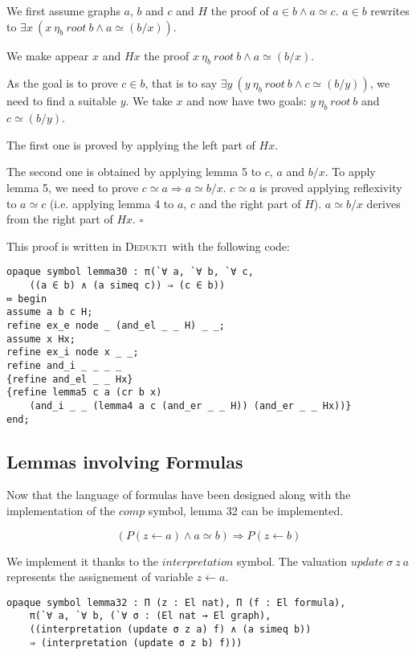 \documentclass[submission,copyright,creativecommons]{eptcs}
\def\imp{\mathbin{\Rightarrow}}
\def\conj{\mathbin{\wedge}}
\def\ex{{\exists}}
\newenvironment{proof}{\noindent {\em Proof.}}{\medskip}
\newcommand{\dedukti}{\textsc{Dedukti}}
\begin{document}
\begin{proof}
We first assume graphs $a$, $b$ and $c$ and $H$ the proof of $ a \in b \conj a \simeq c $. $a \in b$ rewrites to $\ex x~(x~\eta_b~root~b \conj a \simeq (b/x))$. 

We make appear $x$ and $Hx$ the proof $x~\eta_b~root~b \conj a \simeq (b/x)$. 

As the goal is to prove $c \in b$, that is to say $\ex y~(y~\eta_b~root~b \conj c \simeq (b/y))$, we need to find a suitable $y$. We take $x$ and now have two goals: $y~\eta_b~root~b$ and $c \simeq (b/y)$. 

The first one is proved by applying the left part of $Hx$. 

The second one is obtained by applying lemma 5 to $c$, $a$ and $b/x$. To apply lemma 5, we need to prove $c \simeq a \imp a \simeq b/x$. $c \simeq a$ is proved applying reflexivity to $a \simeq c$ (i.e. applying lemma 4 to $a$, $c$ and the right part of $H$). $a \simeq b/x$ derives from the right part of $Hx$. $\square$
\end{proof}

This proof is written in \dedukti ~with the following code: 

\begin{lstlisting}
opaque symbol lemma30 : π(`∀ a, `∀ b, `∀ c, 
	((a ∈ b) ∧ (a simeq c)) ⇒ (c ∈ b))
≔ begin
assume a b c H;
refine ex_e node _ (and_el _ _ H) _ _;
assume x Hx;
refine ex_i node x _ _;
refine and_i _ _ _ _
{refine and_el _ _ Hx}
{refine lemma5 c a (cr b x) 
	(and_i _ _ (lemma4 a c (and_er _ _ H)) (and_er _ _ Hx))}
end;
\end{lstlisting}

\subsection{Lemmas involving Formulas}

Now that the language of formulas have been designed along with the implementation of the $comp$ symbol, lemma 32 can be implemented.

$$(P(z \leftarrow a) \conj a \simeq b) \imp P(z \leftarrow b)$$

We implement it thanks to the $interpretation$ symbol. The valuation $update~\sigma~z~a$ represents the assignement of variable $z \leftarrow a$.

\begin{lstlisting}
opaque symbol lemma32 : Π (z : El nat), Π (f : El formula), 
	π(`∀ a, `∀ b, (`∀ σ : (El nat → El graph),
	((interpretation (update σ z a) f) ∧ (a simeq b)) 
	⇒ (interpretation (update σ z b) f)))
\end{lstlisting}
\end{document}
